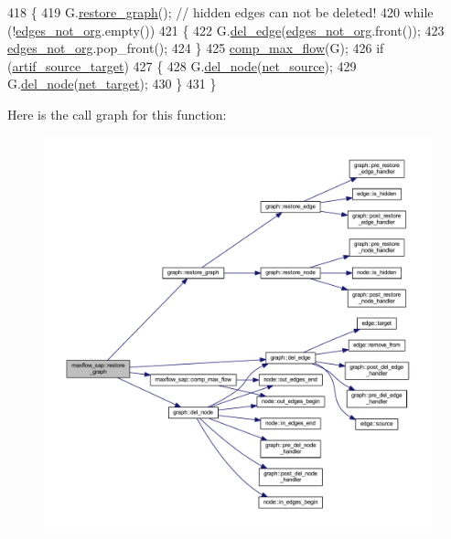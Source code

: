 \begin{DoxyCode}
418 \{
419     G.\mbox{\hyperlink{classgraph_a53e2a5505fa6427587e12d66e4a86cec}{restore\_graph}}(); \textcolor{comment}{// hidden edges can not be deleted!}
420     \textcolor{keywordflow}{while} (!\mbox{\hyperlink{classmaxflow__sap_ac97c4038560f49eee2e781d12a64fdf5}{edges\_not\_org}}.empty())
421     \{
422         G.\mbox{\hyperlink{classgraph_ad9356508c49c542dfd4b7169297387c6}{del\_edge}}(\mbox{\hyperlink{classmaxflow__sap_ac97c4038560f49eee2e781d12a64fdf5}{edges\_not\_org}}.front());
423         \mbox{\hyperlink{classmaxflow__sap_ac97c4038560f49eee2e781d12a64fdf5}{edges\_not\_org}}.pop\_front();
424     \}
425     \mbox{\hyperlink{classmaxflow__sap_ae5ff08e7b1c5fe5845a2ed584b04ca1b}{comp\_max\_flow}}(G);
426     \textcolor{keywordflow}{if} (\mbox{\hyperlink{classmaxflow__sap_a5d19d178a861e252c84fc392e19bf0ae}{artif\_source\_target}})
427     \{
428         G.\mbox{\hyperlink{classgraph_a8bdc09d5b9ac4bd26586b054d8fcbe91}{del\_node}}(\mbox{\hyperlink{classmaxflow__sap_abd4266c76dbd73f7f719d3a4fba2655d}{net\_source}});
429         G.\mbox{\hyperlink{classgraph_a8bdc09d5b9ac4bd26586b054d8fcbe91}{del\_node}}(\mbox{\hyperlink{classmaxflow__sap_a8d0e8f448ed29a1329a70c8f4f496c2c}{net\_target}});
430     \}
431 \}
\end{DoxyCode}
Here is the call graph for this function\+:\nopagebreak
\begin{figure}[H]
\begin{center}
\leavevmode
\includegraphics[width=350pt]{classmaxflow__sap_ad1a311df47e4b9936ead7c306d723ed0_cgraph}
\end{center}
\end{figure}
